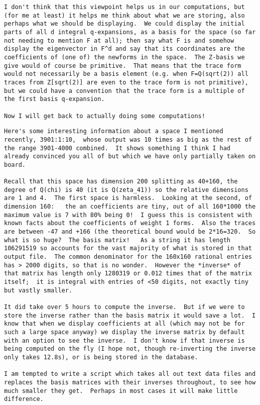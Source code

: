 \documentclass[11pt]{amsart}
\numberwithin{equation}{subsection}
\theoremstyle{definition}
\begin{document}
\begin{verbatim}
I don't think that this viewpoint helps us in our computations, but (for me at least) it helps me think about what we are storing, also perhaps what we should be displaying.  We could display the initial parts of all d integral q-expansions, as a basis for the space (so far not needing to mention F at all); then say what F is and somehow display the eigenvector in F^d and say that its coordinates are the coefficients of (one of) the newforms in the space.  The Z-basis we give would of course be primitive.  That means that the trace form would not necessarily be a basis element (e.g. when F=Q(sqrt(2)) all traces from Z[sqrt(2)] are even to the trace form is not primitive), but we could have a convention that the trace form is a multiple of the first basis q-expansion.

Now I will get back to actually doing some computations!
\end{verbatim}

\begin{verbatim}
Here's some interesting information about a space I mentioned recently, 3901:1:10,  whose output was 10 times as big as the rest of the range 3901-4000 combined.  It shows something I think I had already convinced you all of but which we have only partially taken on board.

Recall that this space has dimension 200 splitting as 40+160, the degree of Q(chi) is 40 (it is Q(zeta_41)) so the relative dimensions are 1 and 4.  The first space is harmless.  Looking at the second, of dimension 160:   the an coefficients are tiny, out of all 160*1000 the maximum value is 7 with 80% being 0!  I guess this is consistent with known facts about the coefficients of weight 1 forms.  Also the traces are between -47 and +166 (the theoretical bound would be 2*16=320.  So what is so huge?  The basis matrix!   As a string it has length 106291519 so accounts for the vast majority of what is stored in that output file.  The common denominator for the 160x160 rational entries has > 2000 digits, so that is no wonder.  However the *inverse* of that matrix has length only 1280319 or 0.012 times that of the matrix itself;  it is integral with entries of <50 digits, not exactly tiny but vastly smaller.
 
It did take over 5 hours to compute the inverse.  But if we were to store the inverse rather than the basis matrix it would save a lot.  I know that when we display coefficients at all (which may not be for such a large space anyway) we display the inverse matrix by default with an option to see the inverse.  I don't know if that inverse is being computed on the fly (I hope not, though re-inverting the inverse only takes 12.8s), or is being stored in the database.

I am tempted to write a script which takes all out text data files and replaces the basis matrices with their inverses throughout, to see how much smaller they get.  Perhaps in most cases it will make little difference.
\end{verbatim}
\end{document}
